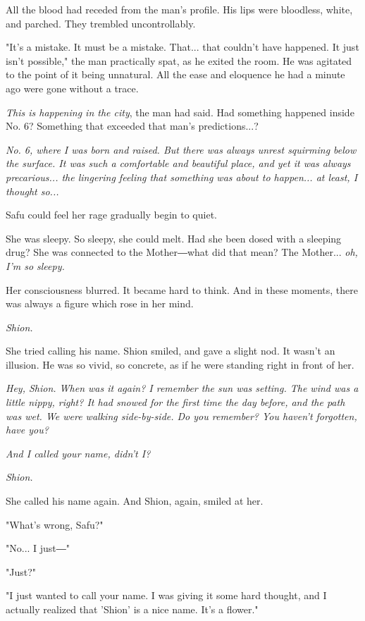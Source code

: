 All the blood had receded from the man's profile. His lips were
bloodless, white, and parched. They trembled uncontrollably.

"It's a mistake. It must be a mistake. That... that couldn't have
happened. It just isn't possible," the man practically spat, as he
exited the room. He was agitated to the point of it being unnatural. All
the ease and eloquence he had a minute ago were gone without a trace.

\emph{This is happening in the city}, the man had said. Had something happened
inside No. 6? Something that exceeded that man's predictions...?

\emph{No. 6, where I was born and raised. But there was always unrest
squirming below the surface. It was such a comfortable and beautiful
place, and yet it was always precarious... the lingering feeling that
something was about to happen... at least, I thought so...}

Safu could feel her rage gradually begin to quiet.

She was sleepy. So sleepy, she could melt. Had she been dosed with a
sleeping drug? She was connected to the Mother―what did that mean? The
Mother... \emph{oh, I'm so sleepy.}

Her consciousness blurred. It became hard to think. And in these
moments, there was always a figure which rose in her mind.

\emph{Shion.}

She tried calling his name. Shion smiled, and gave a slight nod. It
wasn't an illusion. He was so vivid, so concrete, as if he were standing
right in front of her.

\emph{Hey, Shion. When was it again? I remember the sun was setting. The wind
was a little nippy, right? It had snowed for the first time the day
before, and the path was wet. We were walking side-by-side. Do you
remember? You haven't forgotten, have you?}

\emph{And I called your name, didn't I?}

\emph{Shion.}

\myspace

She called his name again. And Shion, again, smiled at her.

"What's wrong, Safu?"

"No... I just―"

"Just?"

"I just wanted to call your name. I was giving it some hard thought, and
I actually realized that 'Shion' is a nice name. It's a flower."

